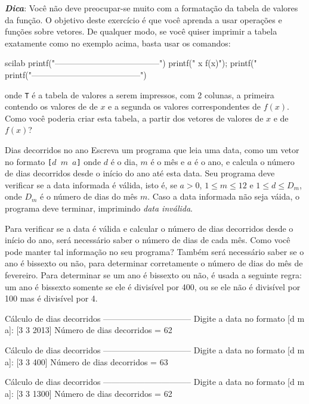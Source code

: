 \documentclass[11pt,fleqn]{practice}
\begin{document}
\textbf{\emph{Dica}}: Você não deve preocupar-se muito com a formatação da tabela de valores da função. O objetivo deste exercício é que você aprenda a usar operações e funções sobre vetores. De qualquer modo, se você quiser imprimir a tabela exatamente como no exemplo acima, basta usar os comandos: 
\begin{lst}{scilab}
printf("\n--------------------------------------\n")
printf(" x       f(x)\n");
printf("%
printf("---------------------------------------\n")
\end{lst}
onde \texttt{T} é a tabela de valores a serem impressos, com 2 colunas, a primeira contendo os valores de de $x$ e a segunda os valores correspondentes de $f(x)$. Como você poderia criar esta tabela, a partir dos vetores de valores de $x$ e de $f(x)$?


\pagebreak
\begin{task}{Dias decorridos no ano}{}
Escreva um programa que leia uma data, como um vetor no formato \texttt{[$d$ $m$ $a$]} onde $d$ é o dia, $m$ é o mês e $a$ é o ano, e calcula o número de dias decorridos desde o início do ano até esta data. Seu programa deve verificar se a data informada é válida, isto é, se $a > 0$, $1 \leq m \leq 12$ e $1 \leq d \leq D_{m}$, onde $D_m$ é o número de dias do mês $m$. 
Caso a data informada não seja váida, o programa deve terminar, imprimindo \emph{data inválida}. 

Para verificar se a data é válida e calcular o número de dias decorridos desde o início do ano, será necessário saber o número de dias de cada mês. Como você pode manter tal informação no seu programa? Também será necessário saber se o ano é bissexto ou não, para determinar corretamente o número de dias do mês de fevereiro. Para determinar se um ano é bissexto ou não, é usada a seguinte regra: um ano é bissexto somente se ele é divisível por 400, ou se ele não é divisível por 100 mas é divisível por 4.

  \begin{runexample}
Cálculo de dias decorridos
--------------------------------
Digite a data no formato [d m a]: [3 3 2013]
Número de dias decorridos = 62
\end{runexample}
 
 \begin{runexample}
Cálculo de dias decorridos
--------------------------------
Digite a data no formato [d m a]: [3 3 400]
Número de dias decorridos = 63
\end{runexample}
 
 \begin{runexample}
Cálculo de dias decorridos
--------------------------------
Digite a data no formato [d m a]: [3 3 1300]
Número de dias decorridos = 62 
\end{runexample}

 \tcblower
  \solution
\end{task}
\end{document}
